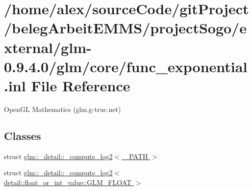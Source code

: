 \hypertarget{func__exponential_8inl}{\section{/home/alex/source\-Code/git\-Project/beleg\-Arbeit\-E\-M\-M\-S/project\-Sogo/external/glm-\/0.9.4.0/glm/core/func\-\_\-exponential.inl File Reference}
\label{func__exponential_8inl}
}


Open\-G\-L Mathematics (glm.\-g-\/truc.\-net)  


\subsection*{Classes}
\begin{DoxyCompactItemize}
\item 
struct \hyperlink{structglm_1_1__detail_1_1__compute__log2}{glm\-::\-\_\-detail\-::\-\_\-compute\-\_\-log2$<$ \-\_\-\-P\-A\-T\-H $>$}
\item 
struct \hyperlink{structglm_1_1__detail_1_1__compute__log2_3_01detail_1_1float__or__int__value_1_1GLM__FLOAT_01_4}{glm\-::\-\_\-detail\-::\-\_\-compute\-\_\-log2$<$ detail\-::float\-\_\-or\-\_\-int\-\_\-value\-::\-G\-L\-M\-\_\-\-F\-L\-O\-A\-T $>$}
\end{DoxyCompactItemize}
